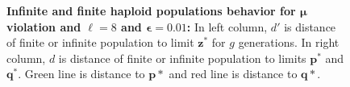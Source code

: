 \begin{figure}[!b]
\begin{center}
\hspace{-3em}%
\vspace{-0.5em} \hspace{-3em}%
\caption[\textbf{Infinite and finite haploid population behavior for $\bm{\mu}$ violation and $\ell = 8$ and 
$\bm{\epsilon} = 0.01$}]{\textbf{Infinite and finite haploid populations behavior for $\bm{\mu}$ violation and $\ell = 8$ and $\bm{\epsilon} = 0.01$:} 
In left column, $d'$ is distance of finite or infinite population to limit $\bm{z}^\ast$ for $g$ generations. 
In right column, $d$ is distance of finite or infinite population to limits $\bm{p}^\ast$ and $\bm{q}^\ast$. Green line is distance to $\bm{p*}$ and red line is distance to $\bm{q*}$.}
\label{oscillation_8h_vio_mu_0.01}
\end{center}
\end{figure}

